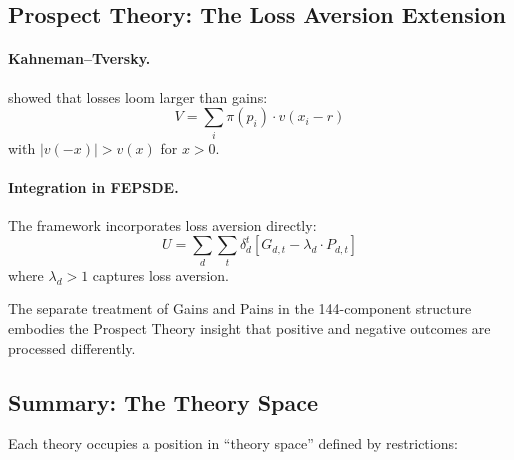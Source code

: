 \subsection{Prospect Theory: The Loss Aversion Extension}

\paragraph{Kahneman--Tversky.}
\citet{kahnemantversky1979} showed that losses loom larger than gains:
\begin{equation}
  V = \sum_i \pi(p_i) \cdot v(x_i - r)
\end{equation}
with $|v(-x)| > v(x)$ for $x > 0$.

\paragraph{Integration in FEPSDE.}
The framework incorporates loss aversion directly:
\begin{equation}
  U = \sum_d \sum_t \delta_d^t [G_{d,t} - \lambda_d \cdot P_{d,t}]
\end{equation}
where $\lambda_d > 1$ captures loss aversion.

The separate treatment of Gains and Pains in the 144-component structure
embodies the Prospect Theory insight that positive and negative outcomes
are processed differently.

\subsection{Summary: The Theory Space}

Each theory occupies a position in ``theory space'' defined by restrictions:

